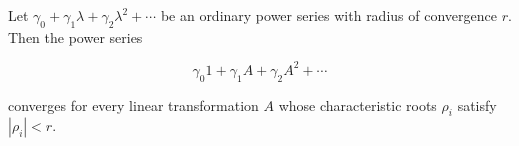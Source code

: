 Let $\gamma_0 + \gamma_1 \lambda + \gamma_2 \lambda^2 + \cdots$ be an ordinary power series with radius of convergence $r$. Then the power series

$$\gamma_0 1 + \gamma_1 A + \gamma_2 A^2 + \cdots$$

converges for every linear transformation $A$ whose characteristic roots $\rho_i$ satisfy $|\rho_i| < r$.

